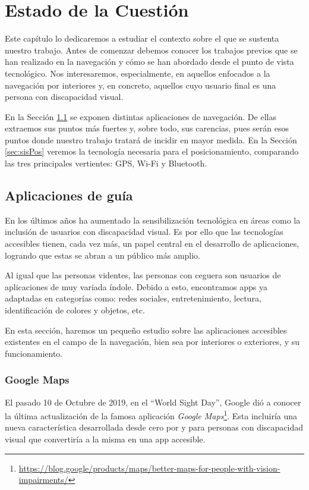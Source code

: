 \chapter{Estado de la Cuestión}
\label{cap:estadoDeLaCuestion}

Este capítulo lo dedicaremos a estudiar el contexto sobre el que se sustenta nuestro trabajo. Antes de comenzar debemos conocer los trabajos previos que se han realizado en la navegación y cómo se han abordado desde el punto de vista tecnológico. Nos interesaremos, especialmente, en aquellos enfocados a la navegación por interiores y, en concreto, aquellos cuyo usuario final es una persona con discapacidad visual. 

En la Sección \ref{sec:appGuia} se exponen distintas aplicaciones de navegación. De ellas extraemos sus puntos más fuertes y, sobre todo, sus carencias, pues serán esos puntos donde nuestro trabajo tratará de incidir en mayor medida. En la Sección \ref{sec:sisPos} veremos la tecnología necesaria para el posicionamiento, comparando las tres principales vertientes: GPS, Wi-Fi y Bluetooth. 

\section{Aplicaciones de guía}
\label{sec:appGuia}
En los últimos años ha aumentado la sensibilización tecnológica en áreas como la inclusión de usuarios con discapacidad visual. Es por ello que las tecnologías accesibles tienen, cada vez más, un papel central en el desarrollo de aplicaciones, logrando que estas se abran a un público más amplio.


Al igual que las personas videntes, las personas con ceguera son usuarios de aplicaciones de muy variada índole. Debido a esto, encontramos apps ya adaptadas en categorías como: redes sociales, entretenimiento, lectura, identificación de colores y objetos, etc. 

En esta sección, haremos un pequeño estudio sobre las aplicaciones accesibles existentes en el campo de la navegación, bien sea por interiores o exteriores, y su funcionamiento.
\subsection{Google Maps}
El pasado 10 de Octubre de 2019, en el ``World Sight Day'', Google dió a conocer la última actualización de la famosa aplicación \textit{Google Maps}\footnote{\url{https://blog.google/products/maps/better-maps-for-people-with-vision-impairments/}}. Esta incluiría una nueva característica desarrollada desde cero por y para personas con discapacidad visual que convertiría a la misma en una app accesible.


